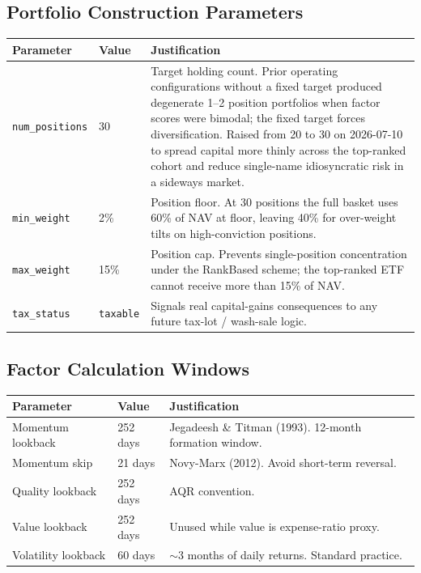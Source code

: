 \documentclass[11pt,a4paper]{article}
\begin{document}
\subsection{Portfolio Construction Parameters}

\begin{table}[H]
\centering
\renewcommand{\arraystretch}{1.4}
\begin{tabular}{p{3.5cm}p{2cm}p{9cm}}
\toprule
\textbf{Parameter} & \textbf{Value} & \textbf{Justification} \\
\midrule
\texttt{num\_positions} & 30 &
Target holding count. Prior operating configurations without a fixed target produced degenerate 1--2 position portfolios when factor scores were bimodal; the fixed target forces diversification. Raised from 20 to 30 on 2026-07-10 to spread capital more thinly across the top-ranked cohort and reduce single-name idiosyncratic risk in a sideways market. \\

\texttt{min\_weight} & 2\% &
Position floor. At 30 positions the full basket uses 60\% of NAV at floor, leaving 40\% for over-weight tilts on high-conviction positions. \\

\texttt{max\_weight} & 15\% &
Position cap. Prevents single-position concentration under the RankBased scheme; the top-ranked ETF cannot receive more than 15\% of NAV. \\

\texttt{tax\_status} & \texttt{taxable} &
Signals real capital-gains consequences to any future tax-lot / wash-sale logic. \\
\bottomrule
\end{tabular}
\end{table}

\subsection{Factor Calculation Windows}

\begin{table}[H]
\centering
\renewcommand{\arraystretch}{1.4}
\begin{tabular}{p{4cm}p{2.5cm}p{7cm}}
\toprule
\textbf{Parameter} & \textbf{Value} & \textbf{Justification} \\
\midrule
Momentum lookback & 252 days & Jegadeesh \& Titman (1993). 12-month formation window. \\
Momentum skip & 21 days & Novy-Marx (2012). Avoid short-term reversal. \\
Quality lookback & 252 days & AQR convention. \\
Value lookback & 252 days & Unused while value is expense-ratio proxy. \\
Volatility lookback & 60 days & $\sim$3 months of daily returns. Standard practice. \\
\bottomrule
\end{tabular}
\end{table}
\end{document}
